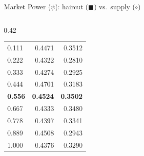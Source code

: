 \documentclass[aspectratio=169,10pt]{beamer}
\begin{document}
\begin{frame}{Market Power ($\psi$): haircut ($\blacksquare$) vs.\ supply ($\circ$)}
\begin{columns}[T]
\begin{column}{0.42\textwidth}
\begin{tabular}{lrr}
        0.111 & 0.4471 & 0.3512 \\
        0.222 & 0.4322 & 0.2810 \\
        0.333 & 0.4274 & 0.2925 \\
        0.444 & 0.4701 & 0.3183 \\
        \textbf{0.556} & \textbf{0.4524} & \textbf{0.3502} \\
        0.667 & 0.4333 & 0.3480 \\
        0.778 & 0.4397 & 0.3341 \\
        0.889 & 0.4508 & 0.2943 \\
        1.000 & 0.4376 & 0.3290 \\
        \bottomrule
      \end{tabular}
    \end{column}
  \end{columns}
\end{frame}
\end{document}
